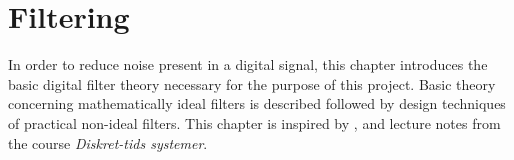 \chapter{Filtering} \label{ch8}
In order to reduce noise present in a digital signal, this chapter introduces the basic digital filter theory necessary for the purpose of this project. Basic theory concerning mathematically ideal filters is described followed by design techniques of practical non-ideal filters. This chapter is inspired by \cite{chapters 5, 7, DTSP}, \cite{section 3.4.4, FSP} and lecture notes from the course \textit{Diskret-tids systemer}.




